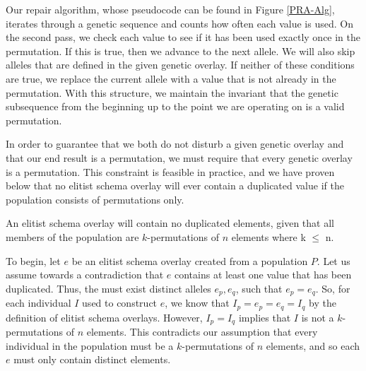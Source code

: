 Our repair algorithm, whose pseudocode can be found in Figure \ref{PRA-Alg}, iterates through a genetic sequence and counts how often each value is used. On the second pass, we check each value to see if it has been used exactly once in the permutation. If this is true, then we advance to the next allele. We will also skip alleles that are defined in the given genetic overlay. If neither of these conditions are true, we replace the current allele with a value that is not already in the permutation. With this structure, we maintain the invariant that the genetic subsequence from the beginning up to the point we are operating on is a valid permutation.

In order to guarantee that we both do not disturb a given genetic overlay and that our end result is a permutation, we must require that every genetic overlay is a permutation. This constraint is feasible in practice, and we have proven below that no elitist schema overlay will ever contain a duplicated value if the population consists of permutations only.

\begin{thm}
An elitist schema overlay will contain no duplicated elements, given that all members of the population are $k$-permutations of $n$ elements where k $\leq$ n.
\end{thm}

To begin, let $e$ be an elitist schema overlay created from a population $P$. Let us assume towards a contradiction that $e$ contains at least one value that has been duplicated. Thus, the must exist distinct alleles $e_p, e_q$, such that $e_p = e_q$. So, for each individual $I$ used to construct $e$, we know that $I_p = e_p = e_q = I_q$ by the definition of elitist schema overlays. However, $I_p = I_q$ implies that $I$ is not a $k$-permutations of $n$ elements. This contradicts our assumption that every individual in the population must be a $k$-permutations of $n$ elements, and so each $e$ must only contain distinct elements. \blacksquare

